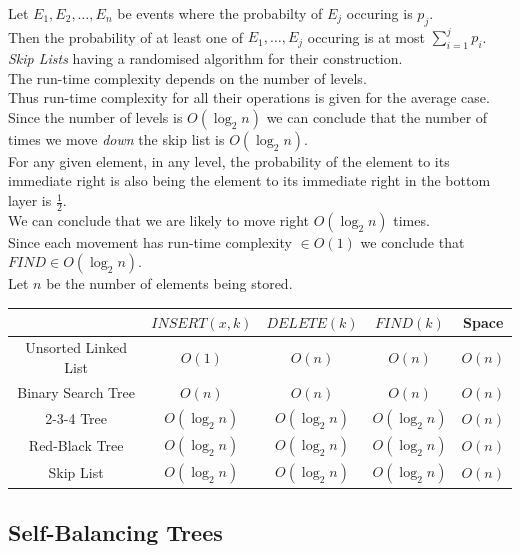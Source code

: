 \documentclass[11pt,a4paper]{article}
\begin{document}
Let $E_1,E_2,\dots,E_n$ be events where the probabilty of $E_j$ occuring is $p_j$.\\
Then the probability of at least one of $E_1,\dots,E_j$ occuring is at most $\sum_{i=1}^jp_i$.\\

\textit{Skip Lists} having a randomised algorithm for their construction.\\
The run-time complexity depends on the number of levels.\\
Thus run-time complexity for all their operations is given for the average case.\\

Since the number of levels is $O(\log_2n)$ we can conclude that the number of times we move \textit{down} the skip list is $O(\log_2n)$.\\
For any given element, in any level, the probability of the element to its immediate right is also being the element to its immediate right in the bottom layer is $\frac{1}{2}$.\\
We can conclude that we are likely to move right $O(\log_2n)$ times.\\
Since each movement has run-time complexity $\in O(1)$ we conclude that $FIND\in O(\log_2n)$.\\

Let $n$ be the number of elements being stored.\\
\begin{tabular}{|c|c|c|c|c|}
  \hline
  &$INSERT(x,k)$&$DELETE(k)$&$FIND(k)$&Space\\
  \hline
  Unsorted Linked List & $O(1)$ & $O(n)$ & $O(n)$ & $O(n)$\\
  \hline
  Binary Search Tree & $O(n)$ & $O(n)$ & $O(n)$ & $O(n)$\\
  \hline
  2-3-4 Tree & $O(\log_2n)$ & $O(\log_2n)$ & $O(\log_2n)$ & $O(n)$\\
  \hline
  Red-Black Tree & $O(\log_2n)$ & $O(\log_2n)$ & $O(\log_2n)$ & $O(n)$\\
  \hline
  Skip List & $O(\log_2n)$ & $O(\log_2n)$ & $O(\log_2n)$ & $O(n)$\\
  \hline
\end{tabular}

\subsection{Self-Balancing Trees}
\end{document}
